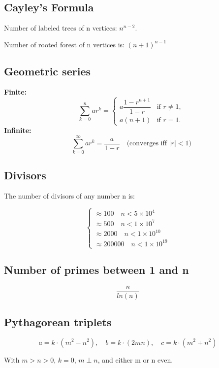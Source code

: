 \documentclass[10pt]{article}
\begin{document}
\begin{multicols*}{2}
\subsection{Cayley's Formula}

Number of labeled trees of n vertices: $n^{n-2}$.

Number of rooted forest of n vertices is: $(n+1)^{n-1}$

\subsection{Geometric series}

\textbf{Finite:} \[\quad \sum_{k=0}^{n} ar^k = 
\begin{cases} 
a \dfrac{1 - r^{n+1}}{1 - r} & \text{if } r \neq 1, \\
a(n + 1) & \text{if } r = 1.
\end{cases}
\]
\textbf{Infinite:} \[\quad \sum_{k=0}^{\infty} ar^k = \frac{a}{1 - r} \quad \text{(converges iff } |r| < 1\text{)}
\]
\subsection{Divisors}

The number of divisors of any number n is:

\[
\begin{cases}
    \approx 100 \quad n< 5 \times 10^4 \\
    \approx 500 \quad n<1 \times 10^7 \\
    \approx 2000 \quad n < 1 \times 10^10 \\
    \approx 200000 \quad n < 1 \times 10^19
\end{cases}
\]

\subsection{Number of primes between 1 and n}

\[
\frac{n}{ln(n)}
\]


\subsection{Pythagorean triplets}

\[
a = k \cdot (m^2 - n^2), \quad b = k\cdot(2mn), \quad c = k\cdot(m^2+n^2)
\]

With $m>n>0$, $k=0$, $m\perp n$, and either m or n even.



\end{multicols*}
\end{document}
